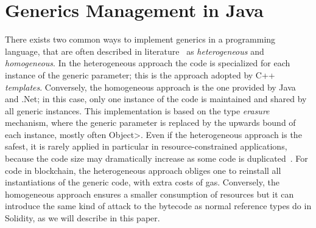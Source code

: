 \section{Generics Management in Java}\label{sec:java_generics}

There exists two common ways to implement generics in a programming language,
that are often described in literature~\cite{generics_categories} as \emph{heterogeneous}
and \emph{homogeneous}. In the heterogeneous approach the code is specialized for each instance
of the generic parameter; this is the approach adopted by C++ \emph{templates}.
Conversely, the homogeneous approach is the one provided by Java and .Net; in this case,
only one instance of the code is maintained and shared by all generic instances.
This implementation is based on the type \emph{erasure} mechanism, where the generic parameter
is replaced by the upwards bound of each instance, mostly often \<Object>.
Even if the heterogeneous approach is the safest, it is rarely applied in particular
in resource-constrained applications, because the code size may dramatically increase
as some code is duplicated~\cite{generics_embedded_systems}. For code in blockchain,
the heterogeneous approach obliges one to reinstall all instantiations of the generic code,
with extra costs of gas.
Conversely, the homogeneous approach ensures a smaller consumption
of resources but it can introduce the same kind of attack to the bytecode
as normal reference types do in Solidity, as we will describe in this paper.
